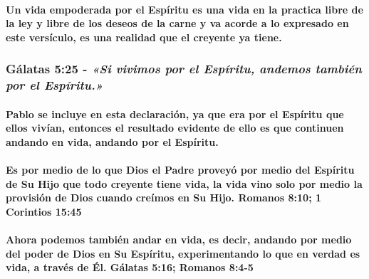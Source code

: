 \documentclass[11a pt,twoside]{article}
\newcommand{\scripture}[1]{%
  {\fontsize{12pt}{16pt}\selectfont\ScriptureFont\itshape #1}%
}
\let\oldsubsubsection\subsubsection
\renewcommand{\subsubsection}{\needspace{4\baselineskip}\oldsubsubsection}
\let\oldparagraph\paragraph
\renewcommand{\paragraph}{\needspace{3\baselineskip}\oldparagraph}
\begin{document}
\paragraph{Un vida empoderada por el Espíritu es una vida en la practica
libre de la ley y libre de los deseos de la carne y va acorde a lo
expresado en este versículo, es una realidad que el creyente ya
tiene.}\label{un-vida-empoderada-por-el-espuxedritu-es-una-vida-en-la-practica-libre-de-la-ley-y-libre-de-los-deseos-de-la-carne-y-va-acorde-a-lo-expresado-en-este-versuxedculo-es-una-realidad-que-el-creyente-ya-tiene.}

\subsubsection{\texorpdfstring{Gálatas 5:25 -
\scripture{«Si vivimos por el Espíritu, andemos también por el Espíritu.»}}{Gálatas 5:25 - }}\label{guxe1latas-525---si-vivimos-por-el-espuxedritu-andemos-tambiuxe9n-por-el-espuxedritu.}

\paragraph{Pablo se incluye en esta declaración, ya que era por el
Espíritu que ellos vivían, entonces el resultado evidente de ello es que
continuen andando en vida, andando por el
Espíritu.}\label{pablo-se-incluye-en-esta-declaraciuxf3n-ya-que-era-por-el-espuxedritu-que-ellos-vivuxedan-entonces-el-resultado-evidente-de-ello-es-que-continuen-andando-en-vida-andando-por-el-espuxedritu.}

\paragraph{Es por medio de lo que Dios el Padre proveyó por medio del
Espíritu de Su Hijo que todo creyente tiene vida, la vida vino solo por
medio la provisión de Dios cuando creímos en Su Hijo. Romanos 8:10; 1
Corintios
15:45}\label{es-por-medio-de-lo-que-dios-el-padre-proveyuxf3-por-medio-del-espuxedritu-de-su-hijo-que-todo-creyente-tiene-vida-la-vida-vino-solo-por-medio-la-provisiuxf3n-de-dios-cuando-creuxedmos-en-su-hijo.-romanos-810-1-corintios-1545}

\paragraph{Ahora podemos también andar en vida, es decir, andando por
medio del poder de Dios en Su Espíritu, experimentando lo que en verdad
es vida, a través de Él. Gálatas 5:16; Romanos
8:4-5}\label{ahora-podemos-tambiuxe9n-andar-en-vida-es-decir-andando-por-medio-del-poder-de-dios-en-su-espuxedritu-experimentando-lo-que-en-verdad-es-vida-a-travuxe9s-de-uxe9l.-guxe1latas-516-romanos-84-5}
\end{document}
